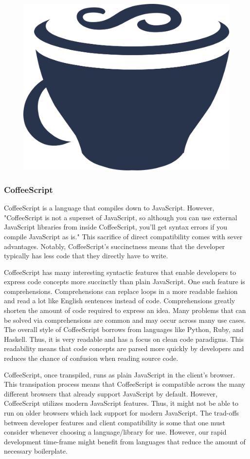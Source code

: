 \documentclass[12pt]{report}
\begin{document}
\begin{enumerate}
\begin{figure}[h]
	\centering
	\includegraphics[width=0.25\linewidth]{coffeescript}
\end{figure}

\subsubsection*{CoffeeScript}

CoffeeScript is a language that compiles down to JavaScript.\cite{coffeescriptlittlebook} However, "CoffeeScript is not a superset of JavaScript, so although you can use external JavaScript libraries from inside CoffeeScript, you'll get syntax errors if you compile JavaScript as is."\cite{coffeescriptlittlebook} This sacrifice of direct compatibility comes with sever advantages. Notably, CoffeeScript's succinctness means that the developer typically has less code that they directly have to write.

CoffeeScript has many interesting syntactic features that enable developers to express code concepts more succinctly than plain JavaScript. One such feature is comprehensions.\cite{coffeescriptguide} Comprehensions can replace loops in a more readable fashion and read a lot like English sentences instead of code. Comprehensions greatly shorten the amount of code required to express an idea. Many problems that can be solved via comprehensions are common and may occur across many use cases. The overall style of CoffeeScript borrows from languages like Python, Ruby, and Haskell. Thus, it is very readable and has a focus on clean code paradigms. This readability means that code concepts are parsed more quickly by developers and reduces the chance of confusion when reading source code.

CoffeeScript, once transpiled, runs as plain JavaScript in the client's browser.\cite{coffeescriptguide} This transipation process means that CoffeeScript is compatible across the many different browsers that already support JavaScript by default. However, CoffeeScript utilizes modern JavaScript features.\cite{coffeescriptguide} Thus, it might not be able to run on older browsers which lack support for modern JavaScript. The trad-offs between developer features and client compatibility is some that one must consider whenever choosing a language/library for use. However, our rapid development time-frame might benefit from languages that reduce the amount of necessary boilerplate.


\end{enumerate}
\end{document}
